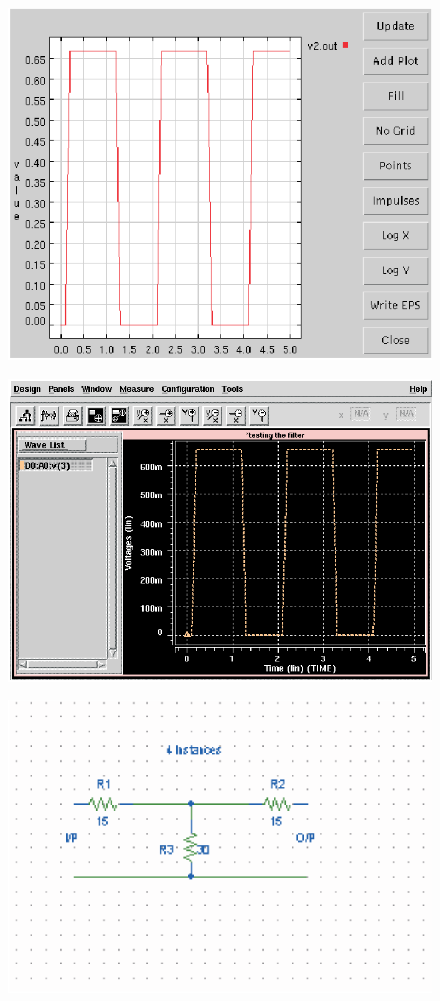 \documentclass{article}
\begin{document}
\begin{figure}
\centerline{\includegraphics{foster1.eps}}
\label{fig1}
\end{figure}
\begin{figure}
\centerline{\includegraphics{foster2.eps}}
\label{fig2}
\end{figure}
\begin{figure}
\centerline{\includegraphics{foster3.eps}}
\label{fig3}
\end{figure}
\end{document}
